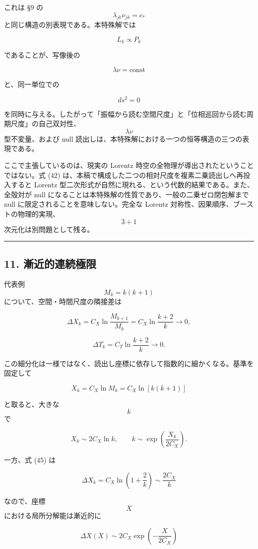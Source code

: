 \documentclass[
  a4paper,
]{ltjsarticle}
\begin{document}
これは §9 の \[\lambda_{jk}\nu_{jk}=c_*\]
と同じ構造の別表現である。本特殊解では

\[
L_k\propto P_k
\]

であることが、写像後の

\[
\lambda\nu=\mathrm{const}
\]

と、同一単位での

\[
ds^2=0
\]

を同時に与える。したがって「振幅から読む空間尺度」と「位相巡回から読む周期尺度」の自己双対性、\[\lambda\nu\]
型不変量、および null
読出しは、本特殊解における一つの恒等構造の三つの表現である。

ここで主張しているのは、現実の Lorentz
時空の全物理が導出されたということではない。式 (42)
は、本稿で構成した二つの相対尺度を複素二乗読出しへ再投入すると Lorentz
型二次形式が自然に現れる、という代数的結果である。また、全殻対が null
になることは本特殊解の性質であり、一般の二乗ゼロ閉包解まで null
に限定されることを意味しない。完全な Lorentz
対称性、因果順序、ブーストの物理的実現、\[3+1\]
次元化は別問題として残る。

\begin{center}\rule{0.5\linewidth}{0.5pt}\end{center}

\subsection{11.
漸近的連続極限}\label{ux6f38ux8fd1ux7684ux9023ux7d9aux6975ux9650}

代表例 \[M_k=k(k+1)\] について、空間・時間尺度の隣接差は

\[
\Delta X_k
=
C_X\ln\frac{M_{k+1}}{M_k}
=
C_X\ln\frac{k+2}{k}
\longrightarrow0,
\tag{45}
\]

\[
\Delta T_k
=
C_T\ln\frac{k+2}{k}
\longrightarrow0.
\tag{46}
\]

この細分化は一様ではなく、読出し座標に依存して指数的に細かくなる。基準を固定して

\[
X_k=C_X\ln M_k
=C_X\ln[k(k+1)]
\]

と取ると、大きな \[k\] で

\[
X_k\sim2C_X\ln k,
\qquad
k\sim\exp\left(\frac{X_k}{2C_X}\right).
\]

一方、式 (45) は

\[
\Delta X_k
=C_X\ln\left(1+\frac{2}{k}\right)
\sim\frac{2C_X}{k}
\]

なので、座標 \[X\] における局所分解能は漸近的に

\[
\boxed{
\Delta X(X)
\sim
2C_X
\exp\left(-\frac{X}{2C_X}\right)
}
\tag{46a}
\]
\end{document}
